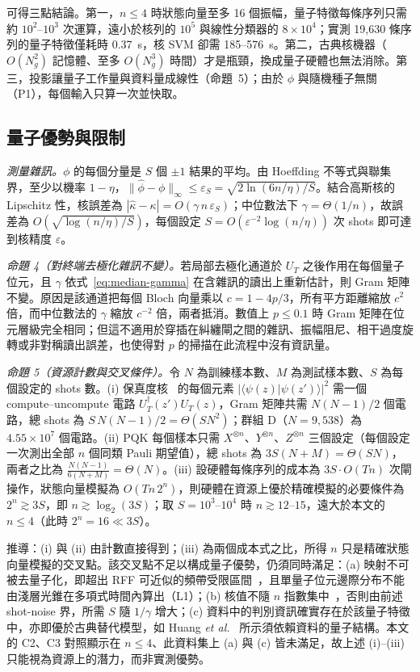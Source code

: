 \documentclass[10pt,a4paper]{article}
\begin{document}
可得三點結論。第一，$n\le4$ 時狀態向量至多 16 個振幅，量子特徵每條序列只需約 $10^2$--$10^3$ 次運算，遠小於核列的 $10^5$ 與線性分類器的 $8\times10^4$；實測 19,630 條序列的量子特徵僅耗時 0.37~s，核 SVM 卻需 185--576~s。第二，古典核機器（$O(N_g^2)$ 記憶體、至多 $O(N_g^3)$ 時間）才是瓶頸，換成量子硬體也無法消除。第三，投影讓量子工作量與資料量成線性（命題~5）；由於 $\phi$ 與隨機種子無關（P1），每個輸入只算一次並快取。

\subsection{量子優勢與限制}
\label{sec:quantum-tradeoffs}

\textit{測量雜訊。}$\phi$ 的每個分量是 $S$ 個 $\pm1$ 結果的平均。由 Hoeffding 不等式與聯集界，至少以機率 $1-\eta$，$\|\hat{\phi}-\phi\|_\infty\le\varepsilon_S=\sqrt{2\ln(6n/\eta)/S}$。結合高斯核的 Lipschitz 性，核誤差為 $|\hat{\kappa}-\kappa|=O(\gamma\,n\,\varepsilon_S)$；中位數法下 $\gamma=\Theta(1/n)$，故誤差為 $O(\sqrt{\log(n/\eta)/S})$，每個設定 $S=O(\varepsilon^{-2}\log(n/\eta))$ 次 shots 即可達到核精度 $\varepsilon$。

\textit{命題 4（對終端去極化雜訊不變）。}若局部去極化通道於 $U_T$ 之後作用在每個量子位元，且 $\gamma$ 依式~\eqref{eq:median-gamma} 在含雜訊的讀出上重新估計，則 Gram 矩陣不變。原因是該通道把每個 Bloch 向量乘以 $c=1-4p/3$，所有平方距離縮放 $c^2$ 倍，而中位數法的 $\gamma$ 縮放 $c^{-2}$ 倍，兩者抵消。數值上 $p\le0.1$ 時 Gram 矩陣在位元層級完全相同；但這不適用於穿插在糾纏閘之間的雜訊、振幅阻尼、相干過度旋轉或非對稱讀出誤差，也使得對 $p$ 的掃描在此流程中沒有資訊量。

\textit{命題 5（資源計數與交叉條件）。}令 $N$ 為訓練樣本數、$M$ 為測試樣本數、$S$ 為每個設定的 shots 數。(i) 保真度核~\cite{havlicek2019} 的每個元素 $|\langle\psi(z)|\psi(z')\rangle|^2$ 需一個 compute--uncompute 電路 $U_T^{\dagger}(z')U_T(z)$，Gram 矩陣共需 $N(N-1)/2$ 個電路，總 shots 為 $S\,N(N-1)/2=\Theta(SN^2)$；群組 D（$N=9{,}538$）為 $4.55\times10^7$ 個電路。(ii) PQK 每個樣本只需 $X^{\otimes n}$、$Y^{\otimes n}$、$Z^{\otimes n}$ 三個設定（每個設定一次測出全部 $n$ 個同類 Pauli 期望值），總 shots 為 $3S(N+M)=\Theta(SN)$，兩者之比為 $\frac{N(N-1)}{6(N+M)}=\Theta(N)$。(iii) 設硬體每條序列的成本為 $3S\cdot O(Tn)$ 次閘操作，狀態向量模擬為 $O(Tn\,2^{n})$，則硬體在資源上優於精確模擬的必要條件為 $2^{n}\gtrsim 3S$，即 $n\gtrsim\log_2(3S)$；取 $S=10^{3}$--$10^{4}$ 時 $n\gtrsim12$--$15$，遠大於本文的 $n\le4$（此時 $2^n=16\ll3S$）。

推導：(i) 與 (ii) 由計數直接得到；(iii) 為兩個成本式之比，所得 $n$ 只是精確狀態向量模擬的交叉點。該交叉點不足以構成量子優勢，仍須同時滿足：(a) 映射不可被去量子化，即超出 RFF 可近似的頻帶受限區間~\cite{schreiber2023surrogates,sweke2023rff}，且單量子位元邊際分布不能由淺層光錐在多項式時間內算出（L1）；(b) 核值不隨 $n$ 指數集中~\cite{thanasilp2024concentration}，否則由前述 shot-noise 界，所需 $S$ 隨 $1/\gamma$ 增大；(c) 資料中的判別資訊確實存在於該量子特徵中，亦即優於古典替代模型，如 Huang \textit{et al.}~\cite{huang2021power} 所示須依賴資料的量子結構。本文的 C2、C3 對照顯示在 $n\le4$、此資料集上 (a) 與 (c) 皆未滿足，故上述 (i)--(iii) 只能視為資源上的潛力，而非實測優勢。
\end{document}
